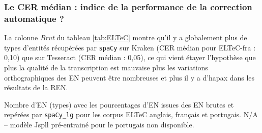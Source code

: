 \subsubsection{Le CER médian : indice de la performance de la correction automatique ?}
\label{subsubsec:seuil}
La colonne \textit{Brut} du tableau \ref{tab:ELTeC} montre qu'il y a globalement plus de types d'entités récupérées par \texttt{spaCy} sur Kraken (CER médian pour ELTeC-fra : 0,10) que sur Tesseract (CER médian : 0,05), ce qui vient étayer l'hypothèse que plus la qualité de la transcription est mauvaise plus les variations orthographiques des EN peuvent être nombreuses et plus il y a d'hapax dans les résultats de la REN.
\begin{table}[h!]
    \centering
    \scriptsize
    
    \caption{Nombre d'EN (types) avec les pourcentages d'EN issues des EN brutes et repérées par \texttt{spaCy\_lg} pour les corpus ELTeC anglais, français et portugais. N/A -- modèle Jspll pré-entrainé pour le portugais non disponible.}
    \label{tab:ELTeC}
\end{table} 

